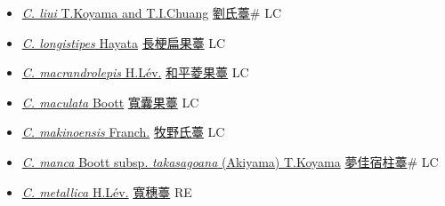 \begin{itemize}
\begin{itemize}
        \item[] \href{http://www.theplantlist.org/tpl1.1/search?q=Carex+liui}{\textit{C. liui} T.Koyama and T.I.Chuang}   \href{\detokenize{http://taibnet.sinica.edu.tw/chi/taibnet_species_list.php?T2=劉氏薹&T2_new_value=true&fr=y}}{劉氏薹}\# LC
        \item[] \href{http://www.theplantlist.org/tpl1.1/search?q=Carex+longistipes}{\textit{C. longistipes} Hayata}   \href{\detokenize{http://taibnet.sinica.edu.tw/chi/taibnet_species_list.php?T2=長梗扁果薹&T2_new_value=true&fr=y}}{長梗扁果薹} LC
        \item[] \href{http://www.theplantlist.org/tpl1.1/search?q=Carex+macrandrolepis}{\textit{C. macrandrolepis} H.Lév.}   \href{\detokenize{http://taibnet.sinica.edu.tw/chi/taibnet_species_list.php?T2=和平菱果薹&T2_new_value=true&fr=y}}{和平菱果薹} LC
        \item[] \href{http://www.theplantlist.org/tpl1.1/search?q=Carex+maculata}{\textit{C. maculata} Boott}   \href{\detokenize{http://taibnet.sinica.edu.tw/chi/taibnet_species_list.php?T2=寬囊果薹&T2_new_value=true&fr=y}}{寬囊果薹} LC
        \item[] \href{http://www.theplantlist.org/tpl1.1/search?q=Carex+makinoensis}{\textit{C. makinoensis} Franch.}   \href{\detokenize{http://taibnet.sinica.edu.tw/chi/taibnet_species_list.php?T2=牧野氏薹&T2_new_value=true&fr=y}}{牧野氏薹} LC
        \item[] \href{http://www.theplantlist.org/tpl1.1/search?q=Carex+manca+subsp.+takasagoana}{\textit{C. manca} Boott subsp. \textit{takasagoana} (Akiyama) T.Koyama}   \href{\detokenize{http://taibnet.sinica.edu.tw/chi/taibnet_species_list.php?T2=夢佳宿柱薹&T2_new_value=true&fr=y}}{夢佳宿柱薹}\# LC
        \item[] \href{http://www.theplantlist.org/tpl1.1/search?q=Carex+metallica}{\textit{C. metallica} H.Lév.}   \href{\detokenize{http://taibnet.sinica.edu.tw/chi/taibnet_species_list.php?T2=寬穗薹&T2_new_value=true&fr=y}}{寬穗薹} RE

\end{itemize}
\end{itemize}
